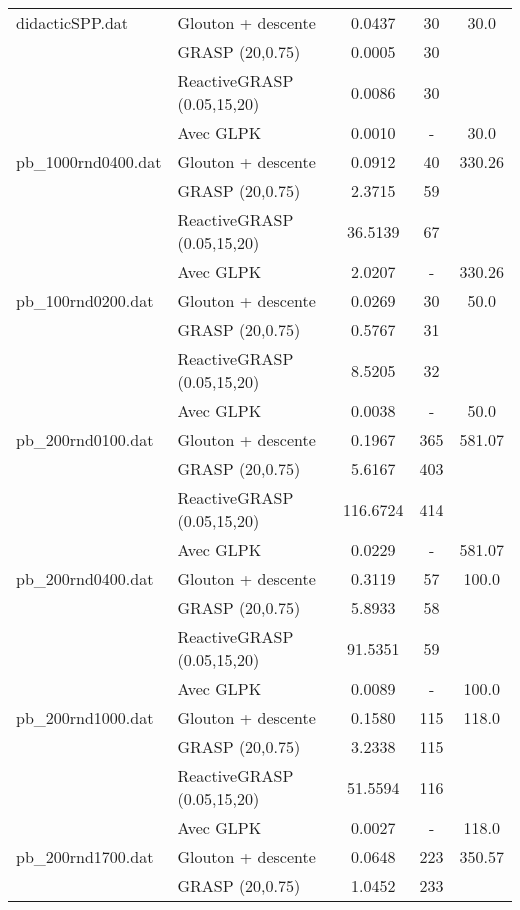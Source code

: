 \begin{minipage}
\begin{longtable}{|l|l|c|c|c|}
didacticSPP.dat & Glouton + descente & 0.0437 & 30 & 30.0 \\
                & GRASP (20,0.75) & 0.0005 & 30 & \\
                & ReactiveGRASP (0.05,15,20) & 0.0086 & 30 & \\
                & Avec GLPK & 0.0010 & - & 30.0 \\
\hline
pb\_1000rnd0400.dat & Glouton + descente & 0.0912 & 40 & 330.26 \\
                    & GRASP (20,0.75) & 2.3715 & 59 & \\
                    & ReactiveGRASP (0.05,15,20) & 36.5139 & 67 & \\
                    & Avec GLPK & 2.0207 & - & 330.26 \\
\hline
pb\_100rnd0200.dat & Glouton + descente & 0.0269 & 30 & 50.0 \\
                   & GRASP (20,0.75) & 0.5767 & 31 & \\
                   & ReactiveGRASP (0.05,15,20) & 8.5205 & 32 & \\
                   & Avec GLPK & 0.0038 & - & 50.0 \\
\hline
pb\_200rnd0100.dat & Glouton + descente & 0.1967 & 365 & 581.07 \\
                   & GRASP (20,0.75) & 5.6167 & 403 & \\
                   & ReactiveGRASP (0.05,15,20) & 116.6724 & 414 & \\
                   & Avec GLPK & 0.0229 & - & 581.07 \\
\hline
pb\_200rnd0400.dat & Glouton + descente & 0.3119 & 57 & 100.0 \\
                   & GRASP (20,0.75) & 5.8933 & 58 & \\
                   & ReactiveGRASP (0.05,15,20) & 91.5351 & 59 & \\
                   & Avec GLPK & 0.0089 & - & 100.0 \\
\hline
pb\_200rnd1000.dat & Glouton + descente & 0.1580 & 115 & 118.0 \\
                   & GRASP (20,0.75) & 3.2338 & 115 & \\
                   & ReactiveGRASP (0.05,15,20) & 51.5594 & 116 & \\
                   & Avec GLPK & 0.0027 & - & 118.0 \\
\hline
pb\_200rnd1700.dat & Glouton + descente & 0.0648 & 223 & 350.57 \\
                   & GRASP (20,0.75) & 1.0452 & 233 & \\

\end{longtable}
\end{minipage}
